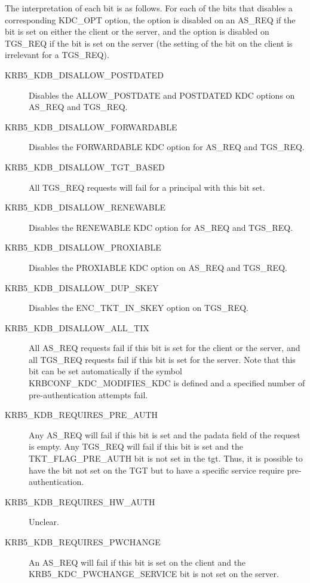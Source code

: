 \begin{description}
The interpretation of each bit is as follows.  For each of the bits
that disables a corresponding KDC_OPT option, the option is disabled
on an AS_REQ if the bit is set on either the client or the server, and
the option is disabled on TGS_REQ if the bit is set on the server (the
setting of the bit on the client is irrelevant for a TGS_REQ).

\begin{description}
\item[KRB5_KDB_DISALLOW_POSTDATED]  Disables the ALLOW_POSTDATE
and POSTDATED KDC options on AS_REQ and TGS_REQ.

\item[KRB5_KDB_DISALLOW_FORWARDABLE] Disables the FORWARDABLE KDC
option for AS_REQ and TGS_REQ.

\item[KRB5_KDB_DISALLOW_TGT_BASED] All TGS_REQ requests will fail for
a principal with this bit set.

\item[KRB5_KDB_DISALLOW_RENEWABLE] Disables the RENEWABLE KDC option for
AS_REQ and TGS_REQ.

\item[KRB5_KDB_DISALLOW_PROXIABLE] Disables the PROXIABLE KDC option on
AS_REQ and TGS_REQ.

\item[KRB5_KDB_DISALLOW_DUP_SKEY] Disables the ENC_TKT_IN_SKEY option on
TGS_REQ.

\item[KRB5_KDB_DISALLOW_ALL_TIX] All AS_REQ requests fail if this bit
is set for the client or the server, and all TGS_REQ requests fail if
this bit is set for the server.  Note that this bit can be set
automatically if the symbol KRBCONF_KDC_MODIFIES_KDC is defined and a
specified number of pre-authentication attempts fail.

\item[KRB5_KDB_REQUIRES_PRE_AUTH] Any AS_REQ will fail if this bit is
set and the padata field of the request is empty.  Any TGS_REQ will
fail if this bit is set and the TKT_FLAG_PRE_AUTH bit is not set in
the tgt.  Thus, it is possible to have the bit not set on the TGT but
to have a specific service require pre-authentication.

\item[KRB5_KDB_REQUIRES_HW_AUTH] Unclear.

\item[KRB5_KDB_REQUIRES_PWCHANGE] An AS_REQ will fail if this bit is
set on the client and the KRB5_KDC_PWCHANGE_SERVICE bit is not set on
the server.


\end{description}
\end{description}
